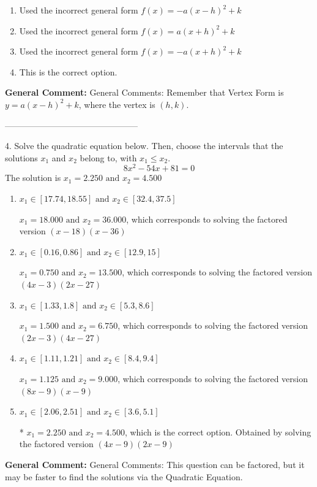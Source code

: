 \documentclass{extbook}[14pt]
\begin{document}
\begin{enumerate}[label=\Alph*.] 
\item Used the incorrect general form $f(x) = -a(x-h)^2 + k$  
\item Used the incorrect general form $f(x) = a(x+h)^2 + k$  
\item Used the incorrect general form $f(x) = -a(x+h)^2 + k$  
\item This is the correct option.  
\end{enumerate} 
 
\textbf{General Comment:} General Comments: Remember that Vertex Form is $y = a(x-h)^2+k$, where the vertex is $(h, k)$. 

-----------------------------------------------

4. Solve the quadratic equation below. Then, choose the intervals that the solutions $x_1$ and $x_2$ belong to, with $x_1 \leq x_2$.
\[ 8x^{2} -54 x + 81 = 0 \] 
The solution is $ x_1 = 2.250 \text{ and } x_2 = 4.500 $ 

\begin{enumerate}[label=\Alph*.] 
\item $ x_1 \in [17.74, 18.55] \text{ and } x_2 \in [32.4, 37.5] $ 

 $x_1 = 18.000 \text{ and } x_2 = 36.000$, which corresponds to solving the factored version $(x -18)(x -36)$ 
\item $ x_1 \in [0.16, 0.86] \text{ and } x_2 \in [12.9, 15] $ 

 $x_1 = 0.750 \text{ and } x_2 = 13.500$, which corresponds to solving the factored version $(4x -3)(2x -27)$ 
\item $ x_1 \in [1.33, 1.8] \text{ and } x_2 \in [5.3, 8.6] $ 

 $x_1 = 1.500 \text{ and } x_2 = 6.750$, which corresponds to solving the factored version $(2x -3)(4x -27)$ 
\item $ x_1 \in [1.11, 1.21] \text{ and } x_2 \in [8.4, 9.4] $ 

 $x_1 = 1.125 \text{ and } x_2 = 9.000$, which corresponds to solving the factored version $(8x -9)(x -9)$ 
\item $ x_1 \in [2.06, 2.51] \text{ and } x_2 \in [3.6, 5.1] $ 

 * $x_1 = 2.250 \text{ and } x_2 = 4.500$, which is the correct option. Obtained by solving the factored version $(4x -9)(2x -9)$ 
\end{enumerate} 
 
\textbf{General Comment:} General Comments: This question can be factored, but it may be faster to find the solutions via the Quadratic Equation. 
\end{document}
